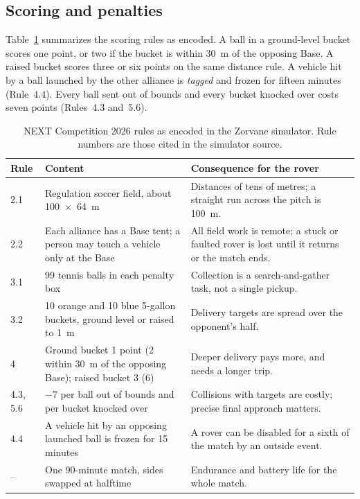 \subsection{Scoring and penalties}

Table~\ref{tab:next-rules} summarizes the scoring rules as encoded.
A ball in a ground-level bucket scores one point, or two if the bucket is within 30~m of the opposing Base.
A raised bucket scores three or six points on the same distance rule.
A vehicle hit by a ball launched by the other alliance is \emph{tagged} and frozen for fifteen minutes (Rule~4.4).
Every ball sent out of bounds and every bucket knocked over costs seven points (Rules~4.3 and~5.6).

\begin{table}[ht]
\centering
\caption{NEXT Competition 2026 rules as encoded in the Zorvane simulator. Rule numbers are those cited in the simulator source. }
\label{tab:next-rules}
\begin{tabularx}{\textwidth}{@{}l X X@{}}
\toprule
Rule & Content & Consequence for the rover \\
\midrule
2.1 & Regulation soccer field, about 100~$\times$~64~m & Distances of tens of metres; a straight run across the pitch is 100~m. \\
2.2 & Each alliance has a Base tent; a person may touch a vehicle only at the Base & All field work is remote; a stuck or faulted rover is lost until it returns or the match ends. \\
3.1 & 99 tennis balls in each penalty box & Collection is a search-and-gather task, not a single pickup. \\
3.2 & 10 orange and 10 blue 5-gallon buckets, ground level or raised to 1~m & Delivery targets are spread over the opponent's half. \\
4 & Ground bucket 1 point (2 within 30~m of the opposing Base); raised bucket 3 (6) & Deeper delivery pays more, and needs a longer trip. \\
4.3, 5.6 & $-7$ per ball out of bounds and per bucket knocked over & Collisions with targets are costly; precise final approach matters. \\
4.4 & A vehicle hit by an opposing launched ball is frozen for 15 minutes & A rover can be disabled for a sixth of the match by an outside event. \\
-- & One 90-minute match, sides swapped at halftime & Endurance and battery life for the whole match. \\
\bottomrule
\end{tabularx}
\end{table}

